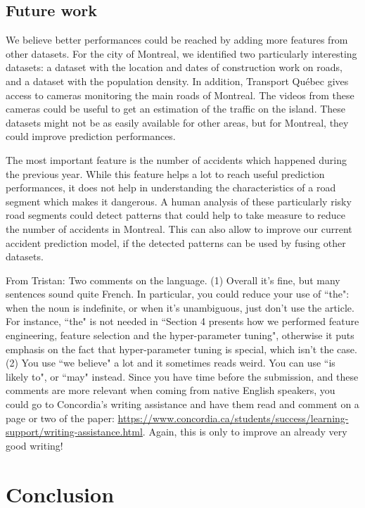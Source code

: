 \documentclass[conference]{IEEEtran}
\newcommand{\TG}[1]{\colorlet{saved}{.}\color{orange}From Tristan: #1\color{saved}}
\begin{document}
\subsection{Future work}

We believe better performances could be reached by adding more features
from other datasets. For the city of Montreal, we identified two
particularly interesting datasets: a dataset with the location and dates of
construction work on roads, and a dataset with the population density.
In addition, Transport Qu\'ebec gives access to cameras monitoring the main
roads of Montreal. The videos from these cameras could be useful to get an
estimation of the traffic on the island. These datasets might not be as
easily available for other areas, but for Montreal, they could improve 
prediction performances.

The most important feature is the number of accidents which happened during
the previous year. While this feature helps a lot to reach useful prediction
performances, it does not help in understanding the characteristics of a
road segment which makes it dangerous. A human analysis of these
particularly risky road segments could detect patterns that could help to
take measure to reduce the number of accidents in Montreal. This can also
allow to improve our current accident prediction model, if the detected
patterns can be used by fusing other datasets.

\TG{Two comments on the language. (1) Overall it's fine, but many sentences sound 
quite French. In particular, you could reduce your use of ``the": when the noun is indefinite, or when it's unambiguous, just don't use the article.  For instance, ``the" is not needed in ``Section
4 presents how we performed feature engineering, feature
selection and the hyper-parameter tuning", otherwise it puts emphasis on the fact that hyper-parameter tuning is special, which isn't the case. (2) You use ``we believe" a lot and it sometimes reads weird. You can use ``is likely to", or ``may" instead. Since you have time before the submission, and these comments are more relevant when coming from native English speakers, you could go to Concordia's writing assistance and have them read and comment on a page or two of the paper: \url{https://www.concordia.ca/students/success/learning-support/writing-assistance.html}. Again, this is only to improve an already very good writing!}

\section*{Conclusion}
\end{document}
